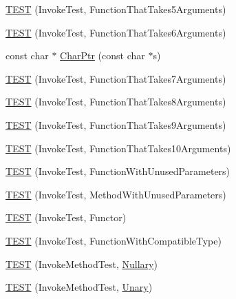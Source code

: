 \begin{DoxyCompactItemize}
\item 
\hyperlink{namespacetesting_1_1gmock__more__actions__test_a3b6b1b682295a1d04d57374445359e94}{T\+E\+ST} (Invoke\+Test, Function\+That\+Takes5\+Arguments)
\item 
\hyperlink{namespacetesting_1_1gmock__more__actions__test_a9a6c89b83ba253838d05d7ee5da7d954}{T\+E\+ST} (Invoke\+Test, Function\+That\+Takes6\+Arguments)
\item 
const char $\ast$ \hyperlink{namespacetesting_1_1gmock__more__actions__test_aa19ac39aaa785adeb8d7837d58b824f3}{Char\+Ptr} (const char $\ast$s)
\item 
\hyperlink{namespacetesting_1_1gmock__more__actions__test_af4756ff87444dc6deb438a350ab5527f}{T\+E\+ST} (Invoke\+Test, Function\+That\+Takes7\+Arguments)
\item 
\hyperlink{namespacetesting_1_1gmock__more__actions__test_a48d99224a323afa3c9772a868dd60214}{T\+E\+ST} (Invoke\+Test, Function\+That\+Takes8\+Arguments)
\item 
\hyperlink{namespacetesting_1_1gmock__more__actions__test_a65d674aacb46d8bf79dbdfe0d49df442}{T\+E\+ST} (Invoke\+Test, Function\+That\+Takes9\+Arguments)
\item 
\hyperlink{namespacetesting_1_1gmock__more__actions__test_a8939ea1ccb0d8787c926c92441b27f6c}{T\+E\+ST} (Invoke\+Test, Function\+That\+Takes10\+Arguments)
\item 
\hyperlink{namespacetesting_1_1gmock__more__actions__test_a0dd6901e637db57c56f1cf8052b6e1bf}{T\+E\+ST} (Invoke\+Test, Function\+With\+Unused\+Parameters)
\item 
\hyperlink{namespacetesting_1_1gmock__more__actions__test_a4f48af38351403b569fc6dfae7787ed2}{T\+E\+ST} (Invoke\+Test, Method\+With\+Unused\+Parameters)
\item 
\hyperlink{namespacetesting_1_1gmock__more__actions__test_ac56a4cb164b338d3f388ed3f4306a5a5}{T\+E\+ST} (Invoke\+Test, Functor)
\item 
\hyperlink{namespacetesting_1_1gmock__more__actions__test_af9dfd7f1d4186ee4de2d9871a19dba5a}{T\+E\+ST} (Invoke\+Test, Function\+With\+Compatible\+Type)
\item 
\hyperlink{namespacetesting_1_1gmock__more__actions__test_abb046fd809977722720c9ce63afd7af5}{T\+E\+ST} (Invoke\+Method\+Test, \hyperlink{namespacetesting_1_1gmock__more__actions__test_acdd2dd80f777fdb770b513b63064ac19}{Nullary})
\item 
\hyperlink{namespacetesting_1_1gmock__more__actions__test_a386ce48f1f0a49e2b94a16deeffc2084}{T\+E\+ST} (Invoke\+Method\+Test, \hyperlink{namespacetesting_1_1gmock__more__actions__test_aad456ea2ee1b0cb2741b676a34f540a3}{Unary})

\end{DoxyCompactItemize}
